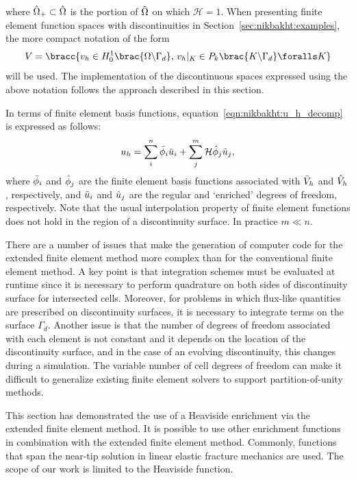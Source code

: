 %
where $\Hat{\Omega}_{+} \subset \Hat{\Omega}$ is the portion of
$\Hat{\Omega}$ on which $\mathcal{H} = 1$.
When presenting finite element function spaces
with discontinuities in Section~\ref{sec:nikbakht:examples}, the more compact
notation of the form
%
\begin{equation}
  V = \bracc{v_{h} \in H_{0}^{1}\brac{\Omega \backslash \Gamma_{d}}, \,
          v_{h}|_{K} \in P_{k}\brac{K \backslash \Gamma_{d}} \foralls K}
\end{equation}
%
will be used. The implementation of the discontinuous spaces expressed
using the above notation follows the approach described in this section.

In terms of finite element basis functions,
equation~\eqref{eqn:nikbakht:u_h_decomp} is expressed as follows:
%
\begin{equation}
  u_{h} = \sum_{i}^{n} \Bar{\phi}_{i} \Bar{u}_{i}
    + \sum_{j}^{m} \mathcal{H} \Hat{\phi}_{j} \Hat{u}_{j},
\label{eqn:nikbakht:basis_decomp}
\end{equation}
%
where $\Bar{\phi}_{i}$ and $\Hat{\phi}_{j}$ are the finite element basis
functions associated with $\Bar{V}_{h}$ and $\Hat{V}_{h}$, respectively,
and $\Bar{u}_{i}$ and $\Hat{u}_{j}$ are the regular and `enriched' degrees
of freedom, respectively. Note that the usual interpolation property
of finite element functions does not hold in the region of a discontinuity
surface. In practice $m \ll n$.

There are a number of issues that make the generation of computer
code for the extended finite element method more complex than for the
conventional finite element method.  A key point is that integration
schemes must be evaluated at runtime since it is necessary to perform
quadrature on both sides of discontinuity surface for intersected cells.
Moreover, for problems in which flux-like quantities are prescribed
on discontinuity surfaces, it is necessary to integrate terms on the
surface $\Gamma_{d}$.  Another issue is that the number of degrees of
freedom associated with each element is not constant and it depends on
the location of the discontinuity surface, and in the case of an evolving
discontinuity, this changes during a simulation.  The variable number
of cell degrees of freedom can make it difficult to generalize existing
finite element solvers to support partition-of-unity methods.

This section has demonstrated the use of a Heaviside enrichment via the
extended finite element method. It is possible to use other enrichment
functions in combination with the extended finite element method.
Commonly, functions that span the near-tip solution in linear elastic
fracture mechanics are used.  The scope of our work is limited to the
Heaviside function.
